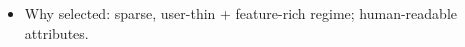 \begin{itemize}
    \item Why selected: sparse, user-thin + feature-rich regime; human-readable attributes. 
\end{itemize}

